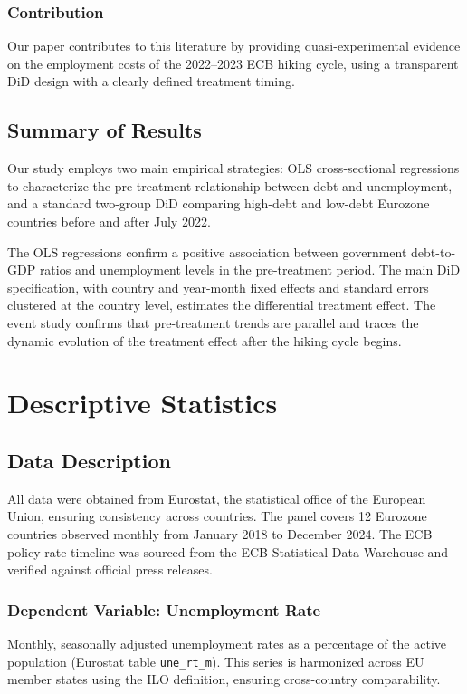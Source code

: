 \documentclass[12pt,a4paper]{article}
\begin{document}
\subsubsection{Contribution}

Our paper contributes to this literature by providing quasi-experimental evidence on the employment costs of the 2022--2023 ECB hiking cycle, using a transparent DiD design with a clearly defined treatment timing.

\subsection{Summary of Results}

Our study employs two main empirical strategies: OLS cross-sectional regressions to characterize the pre-treatment relationship between debt and unemployment, and a standard two-group DiD comparing high-debt and low-debt Eurozone countries before and after July 2022.

The OLS regressions confirm a positive association between government debt-to-GDP ratios and unemployment levels in the pre-treatment period. The main DiD specification, with country and year-month fixed effects and standard errors clustered at the country level, estimates the differential treatment effect. The event study confirms that pre-treatment trends are parallel and traces the dynamic evolution of the treatment effect after the hiking cycle begins.

\section{Descriptive Statistics}

\subsection{Data Description}

All data were obtained from Eurostat, the statistical office of the European Union, ensuring consistency across countries. The panel covers 12 Eurozone countries observed monthly from January 2018 to December 2024. The ECB policy rate timeline was sourced from the ECB Statistical Data Warehouse and verified against official press releases.

\subsubsection{Dependent Variable: Unemployment Rate}
Monthly, seasonally adjusted unemployment rates as a percentage of the active population (Eurostat table \texttt{une\_rt\_m}). This series is harmonized across EU member states using the ILO definition, ensuring cross-country comparability.
\end{document}
